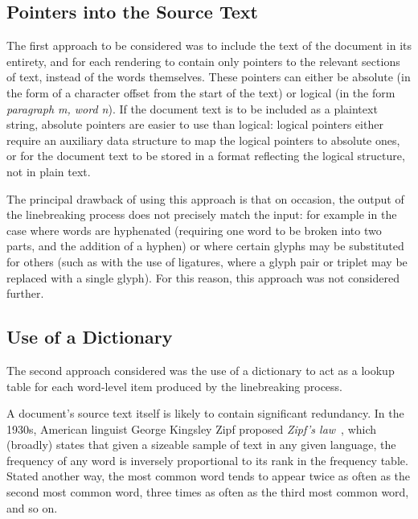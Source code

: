\subsection{Pointers into the Source Text}
The first approach to be considered was to include the text of the document in its entirety, and for each rendering to contain only pointers to the relevant sections of text, instead of the words themselves. These pointers can either be absolute (in the form of a character offset from the start of the text) or logical (in the form \emph{paragraph m, word n}). If the document text is to be included as a plaintext string, absolute pointers are easier to use than logical: logical pointers either require an auxiliary data structure to map the logical pointers to absolute ones, or for the document text to be stored in a format reflecting the logical structure, \ie{} not in plain text.

The principal drawback of using this approach is that on occasion, the output of the linebreaking process does not precisely match the input: for example in the case where words are hyphenated (requiring one word to be broken into two parts, and the addition of a hyphen) or where certain glyphs may be substituted for others (such as with the use of ligatures, where a glyph pair or triplet may be replaced with a single glyph). For this reason, this approach was not considered further.


\subsection{Use of a Dictionary}
\label{sec:dictionary}
The second approach considered was the use of a dictionary to act as a lookup table for each word-level item produced by the linebreaking process.

A document's source text itself is likely to contain significant redundancy. In the 1930s, American linguist George Kingsley Zipf proposed \emph{Zipf's law}~\cite{zipf1932}, which (broadly) states that given a sizeable sample of text in any given language, the frequency of any word is inversely proportional to its rank in the frequency table. Stated another way, the most common word tends to appear twice as often as the second most common word, three times as often as the third most common word, and so on.

